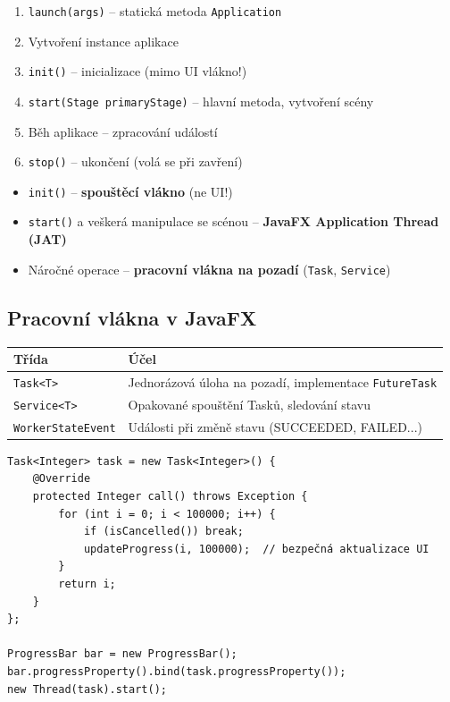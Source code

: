 \documentclass[11pt,a4paper]{article}
\begin{document}
\begin{enumerate}
    \item \texttt{launch(args)} -- statická metoda \texttt{Application}
    \item Vytvoření instance aplikace
    \item \texttt{init()} -- inicializace (mimo UI vlákno!)
    \item \texttt{start(Stage primaryStage)} -- hlavní metoda, vytvoření scény
    \item Běh aplikace -- zpracování událostí
    \item \texttt{stop()} -- ukončení (volá se při zavření)
\end{enumerate}

\begin{tcolorbox}[warnbox,title=Vlákna v JavaFX]
\begin{itemize}
    \item \texttt{init()} -- \textbf{spouštěcí vlákno} (ne UI!)
    \item \texttt{start()} a veškerá manipulace se scénou -- \textbf{JavaFX Application Thread (JAT)}
    \item Náročné operace -- \textbf{pracovní vlákna na pozadí} (\texttt{Task}, \texttt{Service})
\end{itemize}
\end{tcolorbox}

\subsection{Pracovní vlákna v JavaFX}

\begin{center}
\begin{tabular}{>{\raggedright}p{3cm} >{\raggedright\arraybackslash}p{9cm}}
\toprule
\textbf{Třída} & \textbf{Účel} \\
\midrule
\texttt{Task<T>} & Jednorázová úloha na pozadí, implementace \texttt{FutureTask} \\
\texttt{Service<T>} & Opakované spouštění Tasků, sledování stavu \\
\texttt{WorkerStateEvent} & Události při změně stavu (SUCCEEDED, FAILED...) \\
\bottomrule
\end{tabular}
\end{center}

\begin{verbatim}
Task<Integer> task = new Task<Integer>() {
    @Override
    protected Integer call() throws Exception {
        for (int i = 0; i < 100000; i++) {
            if (isCancelled()) break;
            updateProgress(i, 100000);  // bezpečná aktualizace UI
        }
        return i;
    }
};

ProgressBar bar = new ProgressBar();
bar.progressProperty().bind(task.progressProperty());
new Thread(task).start();
\end{verbatim}
\end{document}
